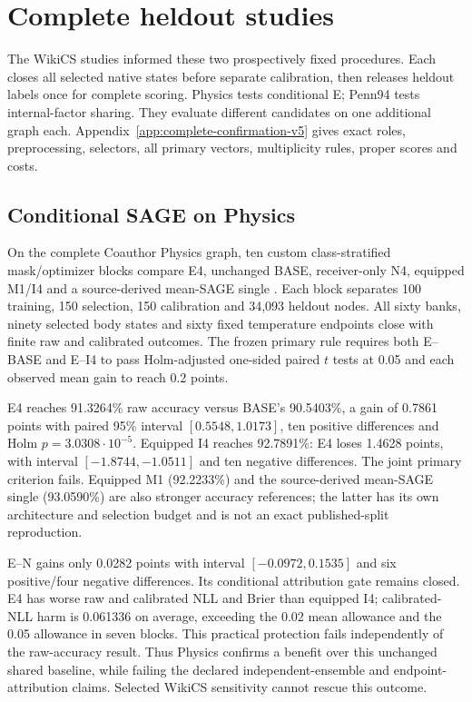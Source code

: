 \section{Complete heldout studies}\label{sec:heldout}
The WikiCS studies informed these two prospectively fixed procedures. Each closes all selected native states before separate calibration, then releases heldout labels once for complete scoring. Physics tests conditional E; Penn94 tests internal-factor sharing. They evaluate different candidates on one additional graph each. Appendix~\ref{app:complete-confirmation-v5} gives exact roles, preprocessing, selectors, all primary vectors, multiplicity rules, proper scores and costs.

\subsection{Conditional SAGE on Physics}\label{sec:physics}
On the complete Coauthor Physics graph, ten custom class-stratified mask/optimizer blocks compare E4, unchanged BASE, receiver-only N4, equipped M1/I4 and a source-derived mean-SAGE single \citep{shchur2018pitfalls}. Each block separates 100 training, 150 selection, 150 calibration and 34,093 heldout nodes. All sixty banks, ninety selected body states and sixty fixed temperature endpoints close with finite raw and calibrated outcomes. The frozen primary rule requires both E--BASE and E--I4 to pass Holm-adjusted one-sided paired $t$ tests at 0.05 and each observed mean gain to reach 0.2 points.

E4 reaches 91.3264\% raw accuracy versus BASE's 90.5403\%, a gain of 0.7861 points with paired 95\% interval $[0.5548,1.0173]$, ten positive differences and Holm $p=3.0308\cdot10^{-5}$. Equipped I4 reaches 92.7891\%: E4 loses 1.4628 points, with interval $[-1.8744,-1.0511]$ and ten negative differences. The joint primary criterion fails. Equipped M1 (92.2233\%) and the source-derived mean-SAGE single (93.0590\%) are also stronger accuracy references; the latter has its own architecture and selection budget and is not an exact published-split reproduction.

E--N gains only 0.0282 points with interval $[-0.0972,0.1535]$ and six positive/four negative differences. Its conditional attribution gate remains closed. E4 has worse raw and calibrated NLL and Brier than equipped I4; calibrated-NLL harm is 0.061336 on average, exceeding the 0.02 mean allowance and the 0.05 allowance in seven blocks. This practical protection fails independently of the raw-accuracy result. Thus Physics confirms a benefit over this unchanged shared baseline, while failing the declared independent-ensemble and endpoint-attribution claims. Selected WikiCS sensitivity cannot rescue this outcome.

